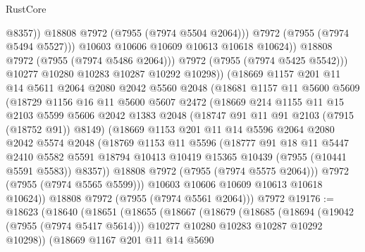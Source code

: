 \begin{lexlean}{RustCore}
\begin{coremodule}
                        @8357))
                    @18808
                    @7972
                    (@7955 (@7974 @5504 @2064)))
                  @7972
                  (@7955 (@7974 @5494 @5527)))
                @10603
                @10606
                @10609
                @10613
                @10618
                @10624))
            @18808
            @7972
            (@7955 (@7974 @5486 @2064)))
          @7972
          (@7955 (@7974 @5425 @5542)))
        @10277
        @10280
        @10283
        @10287
        @10292
        @10298))
    (@18669
      @1157
      @201
      @11
      @14
      @5611
      @2064
      @2080
      @2042
      @5560
      @2048
      (@18681
        @1157
        @11
        @5600
        @5609
        (@18729
          @1156
          @16
          @11
          @5600
          @5607
          @2472
          (@18669
            @214
            @1155
            @11
            @15
            @2103
            @5599
            @5606
            @2042
            @1383
            @2048
            (@18747 @91 @11 @91 @2103 (@7915 (@18752 @91)) @8149)
            (@18669
              @1153
              @201
              @11
              @14
              @5596
              @2064
              @2080
              @2042
              @5574
              @2048
              (@18769
                @1153
                @11
                @5596
                (@18777
                  @91
                  @18
                  @11
                  @5447
                  @2410
                  @5582
                  @5591
                  @18794
                  @10413
                  @10419
                  @15365
                  @10439
                  (@7955 (@10441 @5591 @5583))
                  @8357))
              @18808
              @7972
              (@7955 (@7974 @5575 @2064)))
            @7972
            (@7955 (@7974 @5565 @5599)))
          @10603
          @10606
          @10609
          @10613
          @10618
          @10624))
      @18808
      @7972
      (@7955 (@7974 @5561 @2064)))
    @7972
@19176 := @18623
    (@18640
      (@18651
        (@18655
          (@18667
            (@18679
              (@18685
                (@18694
                  (@19042 (@7955 (@7974 @5417 @5614)))
                  @10277
                  @10280
                  @10283
                  @10287
                  @10292
                  @10298))
              (@18669
                @1167
                @201
                @11
                @14
                @5690

\end{coremodule}
\end{lexlean}
